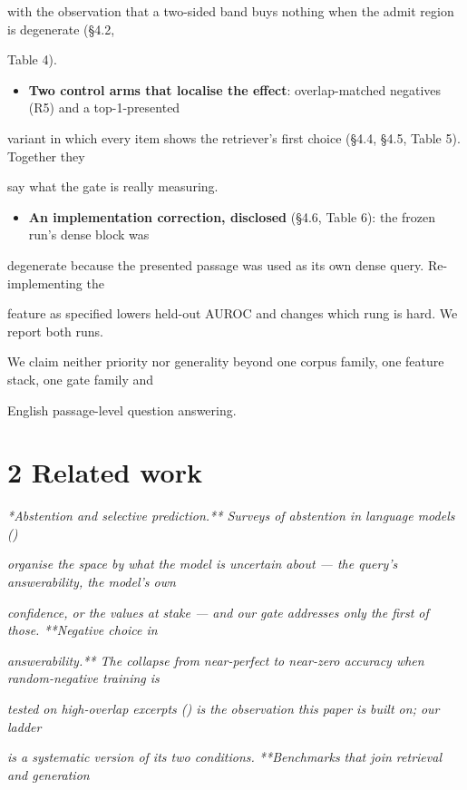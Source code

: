 with the observation that a two-sided band buys nothing when the admit region is degenerate (§4.2,

Table 4).

\begin{itemize}
  \item \textbf{Two control arms that localise the effect}: overlap-matched negatives (R5) and a top-1-presented
\end{itemize}
variant in which every item shows the retriever's first choice (§4.4, §4.5, Table 5). Together they

say what the gate is really measuring.

\begin{itemize}
  \item \textbf{An implementation correction, disclosed} (§4.6, Table 6): the frozen run's dense block was
\end{itemize}
degenerate because the presented passage was used as its own dense query. Re-implementing the

feature as specified lowers held-out AUROC and changes which rung is hard. We report both runs.

We claim neither priority nor generality beyond one corpus family, one feature stack, one gate family and

English passage-level question answering.

\section{2 Related work}
\textit{*Abstention and selective prediction.** Surveys of abstention in language models (\citep{know-your-limits-a-survey-of-abstention-in-large-language-mo})}

\textit{organise the space by what the model is uncertain about --- the query's answerability, the model's own}

\textit{confidence, or the values at stake --- and our gate addresses only the first of those. **Negative choice in}

\textit{answerability.** The collapse from near-perfect to near-zero accuracy when random-negative training is}

\textit{tested on high-overlap excerpts (\citep{answerability-in-retrieval-augmented-open-domain-question-an}) is the observation this paper is built on; our ladder}

\textit{is a systematic version of its two conditions. **Benchmarks that join retrieval and generation}


